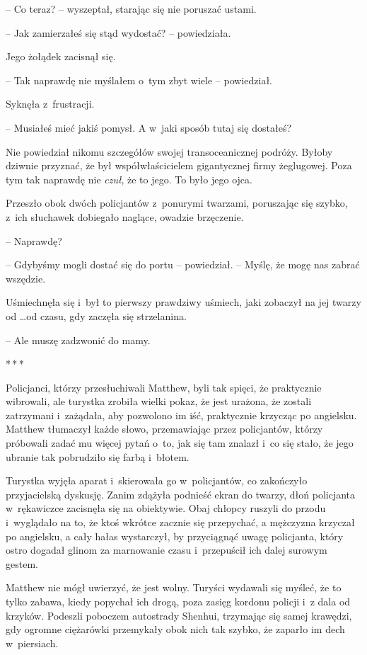 \documentclass[oneside,polish,11pt,rmheadings]{mwbk}
\newcommand{\threeast}{\par\centerline{*\,*\,*}\medskip\par}
\begin{document}
-- Co teraz? -- wyszeptał, starając się nie poruszać ustami.

-- Jak zamierzałeś się stąd wydostać? -- powiedziała.

Jego żołądek zacisnął się. 

-- Tak naprawdę nie myślałem o~tym zbyt wiele -- powiedział.

Syknęła z~frustracji. 

-- Musiałeś mieć jakiś pomysł. A w~jaki sposób tutaj się dostałeś?

Nie powiedział nikomu szczegółów swojej transoceanicznej podróży. Byłoby dziwnie przyznać, że był współwłaścicielem gigantycznej firmy żeglugowej. Poza tym tak naprawdę nie \textit{czuł}, że to jego. To było jego ojca.

Przeszło obok dwóch policjantów z~ponurymi twarzami, poruszając się szybko, z~ich słuchawek dobiegało naglące, owadzie brzęczenie.

-- Naprawdę? 

-- Gdybyśmy mogli dostać się do portu -- powiedział. -- Myślę, że mogę nas zabrać wszędzie. 

Uśmiechnęła się i~był to pierwszy prawdziwy uśmiech, jaki zobaczył na jej twarzy od \ldots  od czasu, gdy zaczęła się strzelanina.

-- Ale muszę zadzwonić do mamy.

\bigskip
\threeast

Policjanci, którzy przesłuchiwali Matthew, byli tak spięci, że praktycznie wibrowali, ale turystka zrobiła wielki pokaz, że jest urażona, że zostali zatrzymani i~zażądała, aby pozwolono im iść, praktycznie krzycząc po angielsku. Matthew tłumaczył każde słowo, przemawiając przez policjantów, którzy próbowali zadać mu więcej pytań o~to, jak się tam znalazł i~co się stało, że jego ubranie tak pobrudziło się farbą i~błotem.

Turystka wyjęła aparat i~skierowała go w~policjantów, co zakończyło przyjacielską dyskusję. Zanim zdążyła podnieść ekran do twarzy, dłoń policjanta w~rękawiczce zacisnęła się na obiektywie. Obaj chłopcy ruszyli do przodu i~wyglądało na to, że ktoś wkrótce zacznie się przepychać, a mężczyzna krzyczał po angielsku, a cały hałas wystarczył, by przyciągnąć uwagę policjanta, który ostro dogadał glinom za marnowanie czasu i~przepuścił ich dalej surowym gestem.

Matthew nie mógł uwierzyć, że jest wolny. Turyści wydawali się myśleć, że to tylko zabawa, kiedy popychał ich drogą, poza zasięg kordonu policji i~z dala od krzyków. Podeszli poboczem autostrady Shenhui, trzymając się samej krawędzi, gdy ogromne ciężarówki przemykały obok nich tak szybko, że zaparło im dech w~piersiach.
\end{document}
